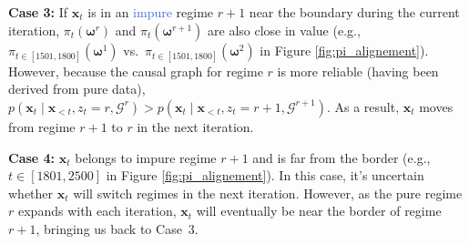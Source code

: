 \textbf{Case 3:}  
If $\boldsymbol{x}_t$ is in an \textcolor{RoyalBlue}{impure} regime $r+1$ near the boundary during the current iteration, $\pi_t(\boldsymbol{\omega}^r)$ and $\pi_t(\boldsymbol{\omega}^{r+1})$ are also close in value (e.g., $\pi_{t \in [1501,1800]}(\boldsymbol{\omega}^1)$ vs.\ $\pi_{t \in [1501,1800]}(\boldsymbol{\omega}^2)$ in Figure \ref{fig:pi_alignement}). However, because the causal graph for regime $r$ is more reliable (having been derived from pure data),
$
p(\boldsymbol{x}_t \mid \boldsymbol{x}_{<t}, z_t = r, \mathcal{G}^r)
>
p(\boldsymbol{x}_t \mid  \boldsymbol{x}_{<t}, z_t = r+1, \mathcal{G}^{r+1}).
$
As a result, $\boldsymbol{x}_t$ moves from regime $r+1$ to $r$ in the next iteration.

\textbf{Case 4:}
$\boldsymbol{x}_t$ belongs to impure regime $r+1$ and is far from the border (e.g., $t \in [1801,2500]$ in Figure \ref{fig:pi_alignement}). In this case, it's uncertain whether $\boldsymbol{x}_t$ will switch regimes in the next iteration. However, as the pure regime $r$ expands with each iteration, $\boldsymbol{x}_t$ will eventually be near the border of regime $r+1$, bringing us back to Case~3.